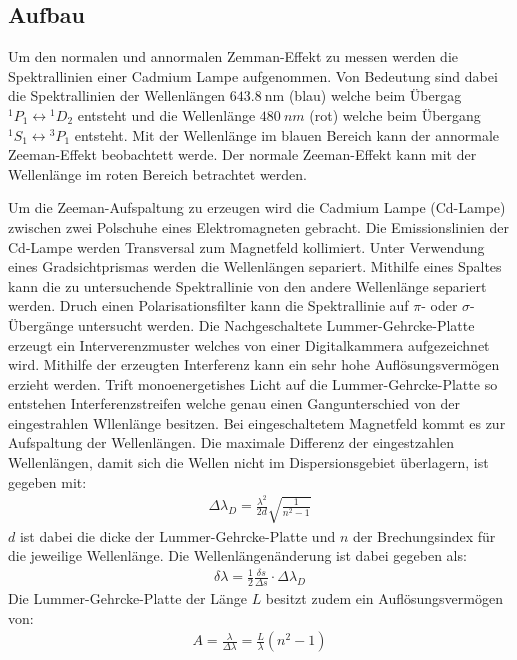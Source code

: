 \subsection{Aufbau}
Um den normalen und annormalen Zemman-Effekt zu messen werden die Spektrallinien einer Cadmium Lampe aufgenommen.
Von Bedeutung sind dabei die Spektrallinien der Wellenlängen $\SI{643.8}{\nano\meter}$ (blau) welche beim Übergag ${}^1P_1\leftrightarrow{}^1D_2$ entsteht und
die Wellenlänge $\SI{480}{nm}$ (rot) welche beim Übergang ${}^1S_1\leftrightarrow{}^3P_1$ entsteht.
Mit der Wellenlänge im blauen Bereich kann der annormale Zeeman-Effekt beobachtett werde.
Der normale Zeeman-Effekt kann mit der Wellenlänge im roten Bereich betrachtet werden.

Um die Zeeman-Aufspaltung zu erzeugen wird die Cadmium Lampe (Cd-Lampe) zwischen zwei Polschuhe eines Elektromagneten gebracht.
Die Emissionslinien der Cd-Lampe werden Transversal zum Magnetfeld kollimiert.
Unter Verwendung eines Gradsichtprismas werden die Wellenlängen separiert.
Mithilfe eines Spaltes kann die zu untersuchende Spektrallinie von den andere Wellenlänge separiert werden.
Druch einen Polarisationsfilter kann die Spektrallinie auf $\pi$- oder $\sigma$- Übergänge untersucht werden.
Die Nachgeschaltete Lummer-Gehrcke-Platte erzeugt ein Interverenzmuster welches von einer Digitalkammera aufgezeichnet wird.
Mithilfe der erzeugten Interferenz kann ein sehr hohe Auflösungsvermögen erzieht werden.
Trift monoenergetishes Licht auf die Lummer-Gehrcke-Platte so entstehen Interferenzstreifen welche genau einen Gangunterschied von der eingestrahlen Wllenlänge besitzen.
Bei eingeschaltetem Magnetfeld kommt es zur Aufspaltung der Wellenlängen.
Die maximale Differenz der eingestzahlen Wellenlängen, damit sich die Wellen nicht im Dispersionsgebiet überlagern, ist gegeben mit:
\begin{align*}
	\Delta \lambda_D =\frac{\lambda^2}{2d}\sqrt{\frac{1}{n^2-1}}
\end{align*}
$d$ ist dabei die dicke der Lummer-Gehrcke-Platte und $n$ der Brechungsindex für die jeweilige Wellenlänge.
Die Wellenlängenänderung ist dabei gegeben als:
\begin{align*}
  \delta \lambda = \frac{1}{2}\frac{\delta s}{\Delta s}\cdot \Delta\lambda_D
\end{align*}
Die Lummer-Gehrcke-Platte der Länge $L$ besitzt zudem ein Auflösungsvermögen von:
\begin{align*}
 A=\frac{\lambda}{\Delta\lambda}=\frac{L}{\lambda}(n^2-1)
\end{align*}



